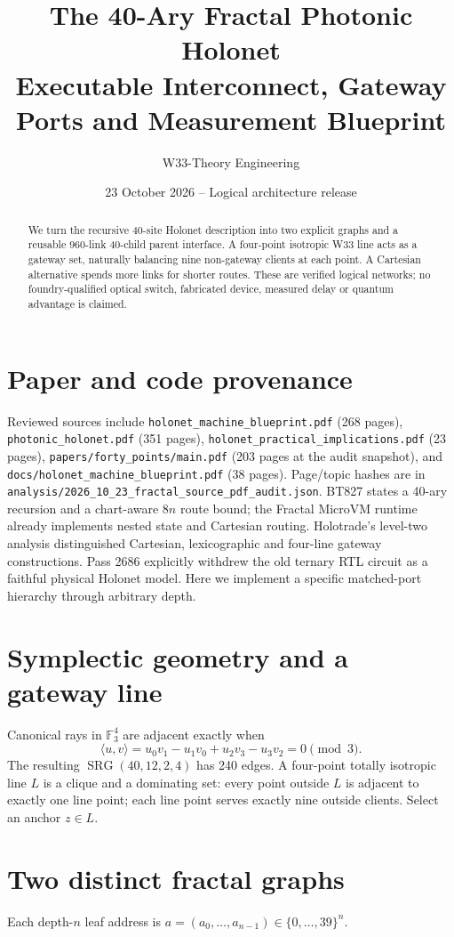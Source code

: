 \documentclass[10pt]{article}
\title{The 40-Ary Fractal Photonic Holonet\\Executable Interconnect, Gateway Ports and Measurement Blueprint}
\author{W33-Theory Engineering}
\date{23 October 2026 -- Logical architecture release}
\begin{document}
\maketitle
\begin{abstract}
We turn the recursive 40-site Holonet description into two explicit graphs and a reusable 960-link 40-child parent interface. A four-point isotropic W33 line acts as a gateway set, naturally balancing nine non-gateway clients at each point. A Cartesian alternative spends more links for shorter routes. These are verified logical networks; no foundry-qualified optical switch, fabricated device, measured delay or quantum advantage is claimed.
\end{abstract}
\tableofcontents
\section{Paper and code provenance}
Reviewed sources include \texttt{holonet\_machine\_blueprint.pdf} (268 pages),
\texttt{photonic\_holonet.pdf} (351 pages), \texttt{holonet\_practical\_implications.pdf} (23 pages),
\texttt{papers/forty\_points/main.pdf} (203 pages at the audit snapshot),
and \texttt{docs/holonet\_machine\_blueprint.pdf} (38 pages).
Page/topic hashes are in \texttt{analysis/2026\_10\_23\_fractal\_source\_pdf\_audit.json}.
BT827 states a 40-ary recursion and a chart-aware $8n$ route bound; the Fractal MicroVM runtime already implements nested state and Cartesian routing. Holotrade's level-two analysis distinguished Cartesian, lexicographic and four-line gateway constructions. Pass 2686 explicitly withdrew the old ternary RTL circuit as a faithful physical Holonet model. Here we implement a specific matched-port hierarchy through arbitrary depth.
\section{Symplectic geometry and a gateway line}
Canonical rays in $\mathbb F_3^4$ are adjacent exactly when
\[
\langle u,v\rangle=u_0v_1-u_1v_0+u_2v_3-u_3v_2=0\pmod3.
\]
The resulting $\operatorname{SRG}(40,12,2,4)$ has 240 edges. A four-point totally isotropic line $L$ is a clique and a dominating set: every point outside $L$ is adjacent to exactly one line point; each line point serves exactly nine outside clients. Select an anchor $z\in L$.
\section{Two distinct fractal graphs}
Each depth-$n$ leaf address is $a=(a_0,\ldots,a_{n-1})\in\{0,\dots,39\}^n$.
\end{document}
